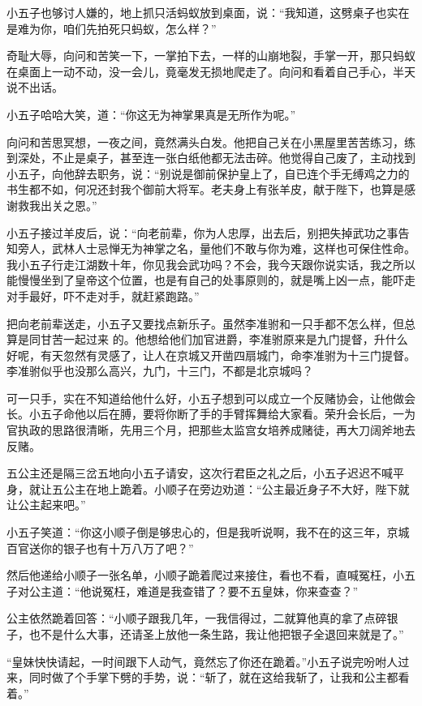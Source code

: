小五子也够讨人嫌的，地上抓只活蚂蚁放到桌面，说：“我知道，这劈桌子也实在是难为你，咱们先拍死只蚂蚁，怎么样？”

奇耻大辱，向问和苦笑一下，一掌拍下去，一样的山崩地裂，手掌一开，那只蚂蚁在桌面上一动不动，没一会儿，竟毫发无损地爬走了。向问和看着自己手心，半天说不出话。

小五子哈哈大笑，道：“你这无为神掌果真是无所作为呢。”

向问和苦思冥想，一夜之间，竟然满头白发。他把自己关在小黑屋里苦苦练习，练到深处，不止是桌子，甚至连一张白纸他都无法击碎。他觉得自己废了，主动找到小五子，向他辞去职务，说：“别说是御前保护皇上了，自已连个手无缚鸡之力的书生都不如，何况还封我个御前大将军。老夫身上有张羊皮，献于陛下，也算是感谢救我出关之恩。”

小五子接过羊皮后，说：“向老前辈，你为人忠厚，出去后，别把失掉武功之事告知旁人，武林人士忌惮无为神掌之名，量他们不敢与你为难，这样也可保住性命。我小五子行走江湖数十年，你见我会武功吗？不会，我今天跟你说实话，我之所以能慢慢坐到了皇帝这个位置，也是有自己的处事原则的，就是嘴上凶一点，能吓走对手最好，吓不走对手，就赶紧跑路。”

把向老前辈送走，小五子又要找点新乐子。虽然李准驸和一只手都不怎么样，但总算是同甘苦一起过来
的。他想给他们加官进爵，李准驸原来是九门提督，升什么好呢，有天忽然有灵感了，让人在京城又开凿四扇城门，命李准驸为十三门提督。李准驸似乎也没那么高兴，九门，十三门，不都是北京城吗？

可一只手，实在不知道给他什么好，小五子想到可以成立一个反赌协会，让他做会长。小五子命他以后在膊，要将你断了手的手臂挥舞给大家看。荣升会长后，一为官执政的思路很清晰，先用三个月，把那些太监宫女培养成赌徒，再大刀阔斧地去反赌。

五公主还是隔三岔五地向小五子请安，这次行君臣之礼之后，小五子迟迟不喊平身，就让五公主在地上跪着。小顺子在旁边劝道：“公主最近身子不大好，陛下就让公主起来吧。”

小五子笑道：“你这小顺子倒是够忠心的，但是我听说啊，我不在的这三年，京城百官送你的银子也有十万八万了吧？”

然后他递给小顺子一张名单，小顺子跪着爬过来接住，看也不看，直喊冤枉，小五子对公主道：“他说冤枉，难道是我查错了？要不五皇妹，你来查查？”

公主依然跪着回答：“小顺子跟我几年，一我信得过，二就算他真的拿了点碎银子，也不是什么大事，还请圣上放他一条生路，我让他把银子全退回来就是了。”

“皇妹快快请起，一时间跟下人动气，竟然忘了你还在跪着。”小五子说完吩咐人过来，同时做了个手掌下劈的手势，说：“斩了，就在这给我斩了，让我和公主都看着。”


